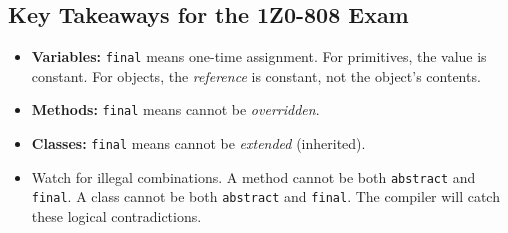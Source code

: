 \documentclass[12pt]{article}
\begin{document}
\begin{enumerate}[label=(\arabic*)]
\section*{Key Takeaways for the 1Z0-808 Exam}
\begin{itemize}
    \item \textbf{Variables:} \texttt{final} means one-time assignment. For primitives, the value is constant. For objects, the \textit{reference} is constant, not the object's contents.
    \item \textbf{Methods:} \texttt{final} means cannot be \textit{overridden}.
    \item \textbf{Classes:} \texttt{final} means cannot be \textit{extended} (inherited).
    \item Watch for illegal combinations. A method cannot be both \texttt{abstract} and \texttt{final}. A class cannot be both \texttt{abstract} and \texttt{final}. The compiler will catch these logical contradictions.
\end{itemize}
\end{enumerate}
\end{document}
